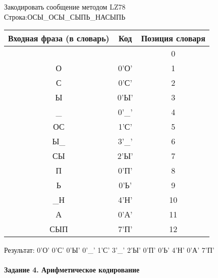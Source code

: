 \documentclass[a4paper, 12pt]{article}
\begin{document}
Закодировать сообщение методом LZ78\\
Строка:ОСЫ\_ОСЫ\_СЫПЬ\_НАСЫПЬ\\
\begin{table}[h!]
\centering
\begin{tabular}{|c|c|c|} 
\hline
 Входная фраза (в словарь) & Код & Позиция словаря \\ \hline

 &  & 0 \\ \hline
О & 0'О' & 1 \\ \hline
С & 0'С' & 2 \\ \hline
Ы & 0'Ы' & 3 \\ \hline
\_ & 0'\_' & 4 \\ \hline
ОС & 1'С' & 5 \\ \hline
Ы\_ & 3'\_' & 6 \\ \hline
СЫ & 2'Ы' & 7 \\ \hline
П & 0'П' & 8 \\ \hline
Ь & 0'Ь' & 9 \\ \hline
\_Н & 4'Н' & 10 \\ \hline
А & 0'А' & 11 \\ \hline
СЫП & 7'П' & 12 \\ \hline
\end{tabular}
\end{table}

Результат: 0'О' 0'С' 0'Ы' 0'\_' 1'С' 3'\_' 2'Ы' 0'П' 0'Ь' 4'Н' 0'А' 7'П'\\
\pagebreak
\paragraph{Задание 4. Арифметическое кодирование\\}
\end{document}
